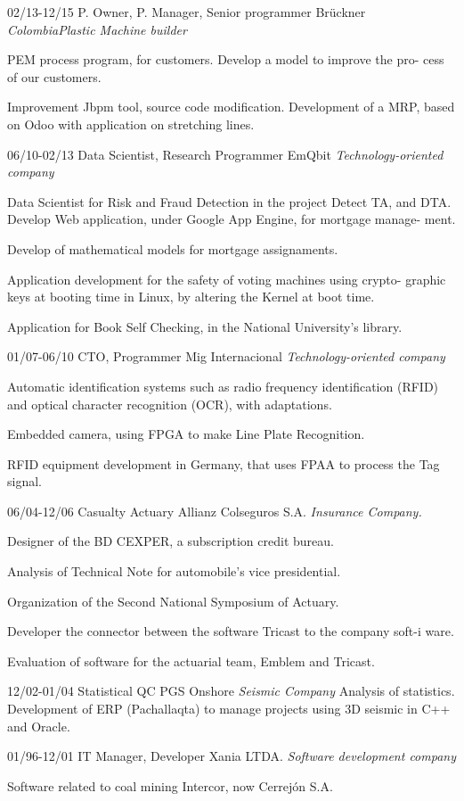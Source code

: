\begin{entrylist}
  \entry
	{02/13-12/15}
	{P. Owner, P. Manager, Senior programmer}
	{Brückner {\sl ColombiaPlastic Machine builder}}
	{PEM process program, for customers. Develop a model to improve the pro-
cess of our customers.

Improvement Jbpm tool, source code modification.
	Development of a MRP, based on Odoo with application on stretching lines.}

  \entry
	{06/10-02/13}
	{Data Scientist, Research Programmer}
	{EmQbit {\sl Technology-oriented company}}
	{Data Scientist for Risk and Fraud Detection in the project Detect TA, and DTA.
Develop Web application, under Google App Engine, for mortgage manage-
ment.

Develop of mathematical models for mortgage assignaments.

Application development for the safety of voting machines using crypto-
graphic keys at booting time in Linux, by altering the Kernel at boot time.

	Application for Book Self Checking, in the National University’s library.}

  \entry
	{01/07-06/10}
	{CTO, Programmer}
	{Mig Internacional {\sl Technology-oriented company}}
	{Automatic identification systems such as radio frequency identification (RFID)
and optical character recognition (OCR), with adaptations.

Embedded camera, using FPGA to make Line Plate Recognition.

RFID equipment development in Germany, that uses FPAA to process the
	Tag signal.}

  \entry
	{06/04-12/06}
	{Casualty Actuary}
	{Allianz Colseguros S.A. {\sl Insurance Company.}}
	{Designer of the BD CEXPER, a subscription credit bureau.

Analysis of Technical Note for automobile’s vice presidential.

Organization of the Second National Symposium of Actuary.

Developer the connector between the software Tricast to the company soft-i
ware.

	Evaluation of software for the actuarial team, Emblem and Tricast.}

  \entry
	{12/02-01/04}
	{Statistical QC}
	{PGS Onshore {\sl Seismic Company}}
	{Analysis of statistics. Development of ERP (Pachallaqta) to manage projects
	using 3D seismic in C++ and Oracle.}

  \entry
	{01/96-12/01}
	{IT Manager, Developer}
	{Xania LTDA. {\sl Software development company}}
	{Software related to coal mining Intercor, now Cerrejón S.A.

}
\end{entrylist}

